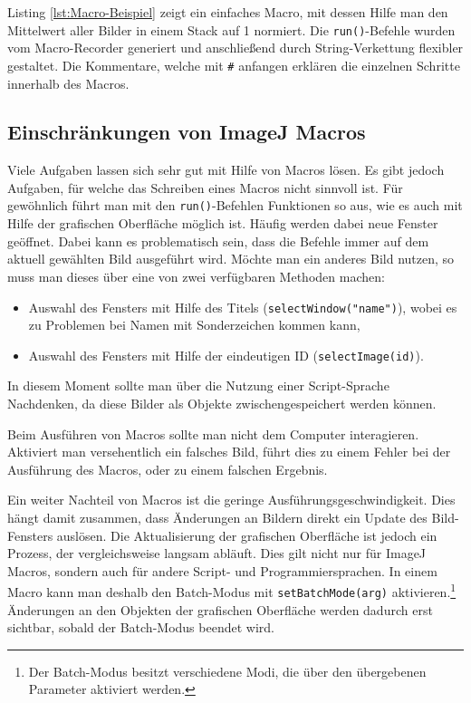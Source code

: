 \documentclass[
	paper=a4,				%
	twoside=true,			%
	BCOR=6mm,				%
	fontsize=12pt,			%
	pagesize=auto,			%
	numbers=noenddot,		%
	bibliography=totoc,		%
	draft=false
]{scrartcl}
\begin{document}
Listing \ref{lst:Macro-Beispiel} zeigt ein einfaches Macro, mit dessen Hilfe man den Mittelwert aller Bilder in einem Stack auf 1 normiert. Die \texttt{run()}-Befehle wurden vom Macro-Recorder generiert und anschließend durch String-Verkettung flexibler gestaltet. Die Kommentare, welche mit \texttt{\#} anfangen erklären die einzelnen Schritte innerhalb des Macros.

\begin{figure}
	
\end{figure}

\subsection*{Einschränkungen von ImageJ Macros}

Viele Aufgaben lassen sich sehr gut mit Hilfe von Macros lösen. Es gibt jedoch Aufgaben, für welche das Schreiben eines Macros nicht sinnvoll ist. Für gewöhnlich führt man mit den \texttt{run()}-Befehlen Funktionen so aus, wie es auch mit Hilfe der grafischen Oberfläche möglich ist. Häufig werden dabei neue Fenster geöffnet. Dabei kann es problematisch sein, dass die Befehle immer auf dem aktuell gewählten Bild ausgeführt wird. Möchte man ein anderes Bild nutzen, so muss man dieses über eine von zwei verfügbaren Methoden machen:

\begin{itemize}
	\item Auswahl des Fensters mit Hilfe des Titels (\texttt{selectWindow("name")}), wobei es zu Problemen bei Namen mit Sonderzeichen kommen kann,
	\item Auswahl des Fensters mit Hilfe der eindeutigen ID (\texttt{selectImage(id)}).
\end{itemize}

In diesem Moment sollte man über die Nutzung einer Script-Sprache Nachdenken, da diese Bilder als Objekte zwischengespeichert werden können.

Beim Ausführen von Macros sollte man nicht dem Computer interagieren. Aktiviert man versehentlich ein falsches Bild, führt dies zu einem Fehler bei der Ausführung des Macros, oder zu einem falschen Ergebnis.

Ein weiter Nachteil von Macros ist die geringe Ausführungsgeschwindigkeit. Dies hängt damit zusammen, dass Änderungen an Bildern direkt ein Update des Bild-Fensters auslösen. Die Aktualisierung der grafischen Oberfläche ist jedoch ein Prozess, der vergleichsweise langsam abläuft. Dies gilt nicht nur für ImageJ Macros, sondern auch für andere Script- und Programmiersprachen. In einem Macro kann man deshalb den Batch-Modus mit \texttt{setBatchMode(arg)} aktivieren.\footnote{Der Batch-Modus besitzt verschiedene Modi, die über den übergebenen Parameter aktiviert werden.}
Änderungen an den Objekten der grafischen Oberfläche werden dadurch erst sichtbar, sobald der Batch-Modus beendet wird.
\end{document}
